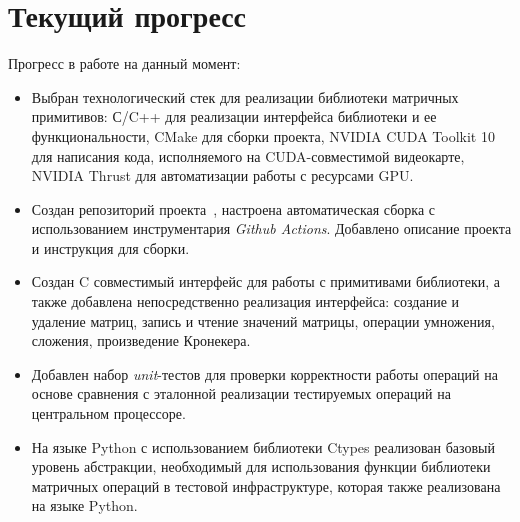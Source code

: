 \section{Текущий прогресс}

Прогресс в работе на данный момент:

\begin{itemize}
    \item Выбран технологический стек для реализации библиотеки матричных примитивов: С/C++ для реализации интерфейса библиотеки и ее функциональности, CMake для сборки проекта, NVIDIA CUDA Toolkit 10 для написания кода, исполняемого на CUDA-совместимой видеокарте, NVIDIA Thrust для автоматизации работы с ресурсами GPU.
    \item Создан репозиторий проекта~\cite{net:cubool_project}, настроена автоматическая сборка с использованием инструментария \textit{Github Actions}. Добавлено описание проекта и инструкция для сборки.
    \item Создан C совместимый интерфейс для работы с примитивами библиотеки, а также добавлена непосредственно реализация интерфейса: создание и удаление матриц, запись и чтение значений матрицы, операции умножения, сложения, произведение Кронекера.
    \item Добавлен набор \textit{unit}-тестов для проверки корректности работы операций на основе сравнения с эталонной реализации тестируемых операций на центральном процессоре.
    \item На языке Python с использованием библиотеки Ctypes реализован базовый уровень абстракции, необходимый для использования функции библиотеки матричных операций в тестовой инфраструктуре, которая также реализована на языке Python.
\end{itemize}